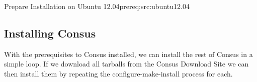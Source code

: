 %
{Prepare Installation on Ubuntu 12.04}{prereq:src:ubuntu12.04}

\subsection{Installing Consus}

With the prerequisites to Consus installed, we can install the rest of Consus in
a simple loop.  If we download all tarballs from the Consus Download Site %
we can then install them by repeating the configure-make-install process for
each.

